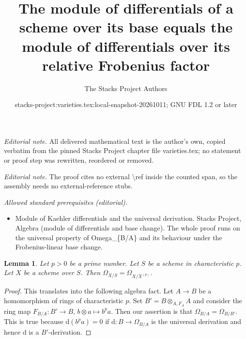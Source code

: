 \documentclass[10pt,a4paper]{amsart}
\title{The module of differentials of a scheme over its base equals the module of differentials over its relative Frobenius factor}
\author{The Stacks Project Authors}
\date{stacks-project:varieties.tex:local-snapshot-20261011; GNU FDL 1.2 or later}
\theoremstyle{plain}
\newtheorem{lemma}[subsection]{Lemma}
\theoremstyle{definition}
\theoremstyle{remark}
\numberwithin{equation}{subsection}
\begin{document}
\maketitle
\noindent\textit{Editorial note.} All delivered mathematical text is the author's own, copied verbatim from the pinned Stacks Project chapter file varieties.tex; no statement or proof step was rewritten, reordered or removed.\par\medskip
\noindent\textit{Editorial note.} The proof cites no external \textbackslash{}ref inside the counted span, so the assembly needs no external-reference stubs.\par\medskip
\noindent\textit{Allowed standard prerequisites (editorial).}\begin{itemize}
\item Module of Kaehler differentials and the universal derivation. Stacks Project, Algebra (module of differentials and base change). The whole proof runs on the universal property of Omega\_\{B/A\} and its behaviour under the Frobenius-linear base change.
\end{itemize}\medskip
\begin{lemma}
\label{lemma-relative-frobenius-omega}
Let $p > 0$ be a prime number. Let $S$ be a scheme in characteristic $p$.
Let $X$ be a scheme over $S$. Then $\Omega_{X/S} = \Omega_{X/X^{(p)}}$.
\end{lemma}

\begin{proof}
This translates into the following algebra fact.
Let $A \to B$ be a homomorphism of rings of characteristic $p$.
Set $B' = B \otimes_{A, F_A} A$ and consider the ring map
$F_{B/A} : B' \to B$, $b \otimes a \mapsto b^pa$.
Then our assertion is that $\Omega_{B/A} = \Omega_{B/B'}$.
This is true because $\text{d}(b^pa) = 0$ if
$\text{d} : B \to \Omega_{B/A}$ is the universal derivation
and hence $\text{d}$ is a $B'$-derivation.
\end{proof}
\end{document}
